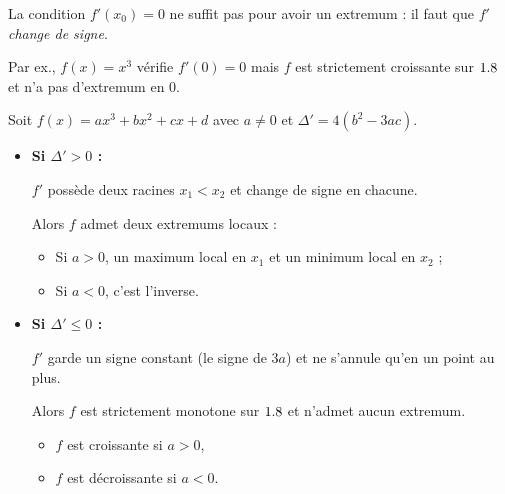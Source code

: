 \begin{piege}
	La condition $f'(x_0) = 0$ ne suffit pas pour avoir un extremum : il faut que $f'$ \emph{change de signe}.

	Par ex., $f(x) = x^3$ vérifie $f'(0) = 0$ mais $f$ est strictement croissante sur $1.8$ et n'a pas d'extremum en $0$.
	\begin{center}
	\end{center}
\end{piege}

\begin{prop}
	Soit $f(x) = ax^3 + bx^2 + cx + d$ avec $a \neq 0$ et $\Delta' = 4(b^2 - 3ac)$.
	\begin{itemize}
		\item \textbf{Si $\Delta' > 0$ :}

		      $f'$ possède deux racines $x_1 < x_2$ et change de signe en chacune.

		      Alors $f$ admet deux extremums locaux :

		      \begin{itemize}
			      \item Si $a > 0$, un maximum local en $x_1$ et un minimum local en $x_2$ ;
			      \item Si $a < 0$, c'est l'inverse.
		      \end{itemize}
		\item \textbf{Si $\Delta' \leq 0$ :}

		      $f'$ garde un signe constant (le signe de $3a$) et ne s'annule qu'en un point au plus.

		      Alors $f$ est strictement monotone sur $1.8$ et n'admet aucun extremum.
		      \begin{itemize}
			      \item $f$ est croissante si $a > 0$,
			      \item $f$ est décroissante si $a < 0$.
		      \end{itemize}
	\end{itemize}


\end{prop}
